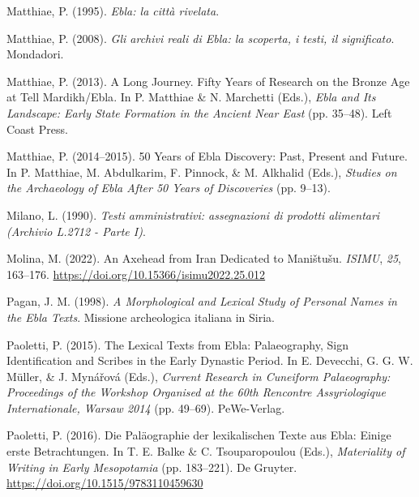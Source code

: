 \documentclass[
]{book}
\newlength{\cslhangindent}
\newlength{\cslentryspacingunit} %
\newenvironment{CSLReferences}[2] %
 {%
  \setlength{\parindent}{0pt}
  \ifodd #1
  \let\oldpar\par
  \def\par{\hangindent=\cslhangindent\oldpar}
  \fi
  \setlength{\parskip}{#2\cslentryspacingunit}
 }%
 {}
\begin{document}
\begin{CSLReferences}{1}{0}
\leavevmode{}%
Matthiae, P. (1995). \emph{Ebla: la città rivelata}.

\leavevmode{}%
Matthiae, P. (2008). \emph{Gli archivi reali di Ebla: la scoperta, i testi, il significato}. Mondadori.

\leavevmode{}%
Matthiae, P. (2013). A {Long Journey}. {Fifty Years} of {Research} on the {Bronze Age} at {Tell Mardikh}/{Ebla}. In P. Matthiae \& N. Marchetti (Eds.), \emph{Ebla and {Its Landscape}: {Early State Formation} in the {Ancient Near East}} (pp. 35--48). Left Coast Press.

\leavevmode{}%
Matthiae, P. (2014--2015). 50 {Years} of {Ebla Discovery}: {Past}, {Present} and {Future}. In P. Matthiae, M. Abdulkarim, F. Pinnock, \& M. Alkhalid (Eds.), \emph{Studies on the {Archaeology} of {Ebla After} 50 {Years} of {Discoveries}} (pp. 9--13).

\leavevmode{}%
Milano, L. (1990). \emph{Testi amministrativi: assegnazioni di prodotti alimentari (Archivio L.2712 - Parte I)}.

\leavevmode{}%
Molina, M. (2022). An {Axehead} from {Iran Dedicated} to {Maništušu}. \emph{ISIMU}, \emph{25}, 163--176. \url{https://doi.org/10.15366/isimu2022.25.012}

\leavevmode{}%
Pagan, J. M. (1998). \emph{A {Morphological} and {Lexical Study} of {Personal Names} in the {Ebla Texts}}. Missione archeologica italiana in Siria.

\leavevmode{}%
Paoletti, P. (2015). The {Lexical Texts} from {Ebla}: {Palaeography}, {Sign Identification} and {Scribes} in the {Early Dynastic Period}. In E. Devecchi, G. G. W. Müller, \& J. Mynářová (Eds.), \emph{Current {Research} in {Cuneiform Palaeography}: {Proceedings} of the {Workshop Organised} at the 60th {Rencontre Assyriologique Internationale}, {Warsaw} 2014} (pp. 49--69). PeWe-Verlag.

\leavevmode{}%
Paoletti, P. (2016). Die Paläographie der lexikalischen Texte aus Ebla: Einige erste Betrachtungen. In T. E. Balke \& C. Tsouparopoulou (Eds.), \emph{Materiality of Writing in Early Mesopotamia} (pp. 183--221). De Gruyter. \url{https://doi.org/10.1515/9783110459630}


\end{CSLReferences}
\end{document}
